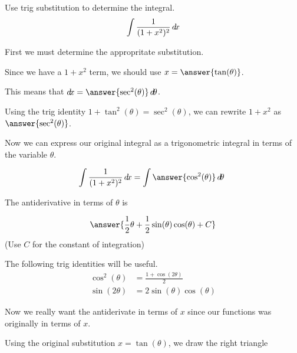 \documentclass{ximera}
\author{Jason Miller}
\begin{document}
\begin{exercise}
Use trig substitution to determine the integral.
\[
\int \frac{1}{(1+x^{2})^{2}} \mathop{}\!d\! x
\]

First we must determine the appropritate substitution. 

Since we have a $1+x^{2}$ term, we should use $x=\answer{\tan(\theta)}$. 

This means that $\d x= \answer{ \sec^{2}(\theta)} \d \theta$. 

\begin{exercise}
Using the trig identity $1+\tan^{2}(\theta)=\sec^{2}(\theta)$, we can rewrite $1+x^{2}$ as $\answer{\sec^{2}(\theta)}$. 

Now we can express our original integral as a trigonometric integral in terms of the variable $\theta$. 

\[
\int \frac{1}{(1+x^{2})^{2}} \d x= \int \answer{ \cos^{2}(\theta)} \d \theta\
\]

The antiderivative in terms of $\theta$ is 

\[
\answer{ \frac{1}{2}\theta + \frac{1}{2}\sin(\theta)\cos(\theta) + C}
\]
(Use $C$ for the constant of integration)

\begin{hint}
The following trig identities will be useful.
\begin{align}
\cos^{2}(\theta)&=\frac{1+\cos(2\theta)}{2} \\
\sin(2\theta)&=2\sin(\theta)\cos(\theta)
\end{align}
\end{hint}

Now we really want the antiderivate in terms of $x$ since our functions was originally in terms of $x$. 

\begin{exercise}
Using the original substitution $x=\tan(\theta)$, we draw the right triangle 

    \begin{image}
    \end{image}


\end{exercise}
\end{exercise}
\end{exercise}
\end{document}
